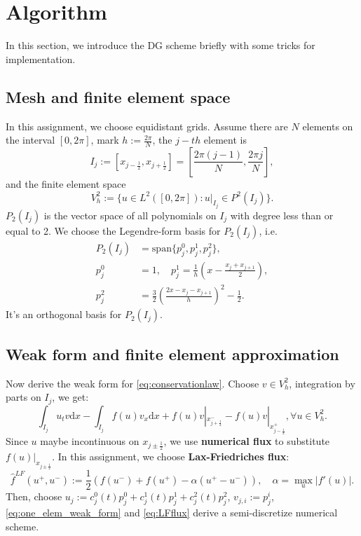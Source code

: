 \documentclass[a4paper]{article}
\newcommand{\dif}{\mathrm{d}}
\begin{document}
\section{Algorithm}
In this section, we introduce the DG scheme briefly with some tricks for implementation.

\subsection{Mesh and finite element space}
In this assignment, we choose equidistant grids. Assume there are $N$ elements on the 
interval $[0,2\pi]$, mark $h:=\frac{2\pi}{N}$, the $j-th$ element is 
\begin{displaymath}
    I_{j}:=[x_{j-\frac{1}{2}},x_{j+\frac{1}{2}}]
    =\left[\frac{2\pi(j-1)}{N},\frac{2\pi j}{N}\right],
\end{displaymath}
and the finite element space 
\begin{displaymath}
    V_{h}^{2}:=\{u\in L^{2}([0,2\pi]):u|_{I_j}\in P^{2}(I_j)\}.
\end{displaymath}
$P_{2}(I_{j})$ is the vector space of all polynomials on 
$I_{j}$ with degree less than or equal to 2. 
We choose the Legendre-form basis for $P_{2}(I_{j})$, i.e. 
\begin{equation}
    \label{eq:basis}
    \begin{aligned}
        P_{2}(I_j)&=\text{span}\{p_{j}^{0},p_{j}^{1},p_{j}^2\},\\
        p_{j}^{0}&=1,\quad p_{j}^{1}=\frac{1}{h}\left(x-\frac{x_{j}+x_{j+1}}{2}\right),\\
        p_{j}^{2}&=\frac{3}{2}\left(\frac{2x-x_{j}-x_{j+1}}{h}\right)^2-\frac{1}{2}.
    \end{aligned}
\end{equation}
It's an orthogonal basis for $P_{2}(I_j)$.
\subsection{Weak form and finite element approximation}
Now derive the weak form for \eqref{eq:conservationlaw}. Choose $v\in V_{h}^{2}$, 
integration by parts on $I_{j}$, we get:
\begin{equation}
    \label{eq:one_elem_weak_form}
    \int_{I_j}u_t v\dif x-\int_{I_j}f(u)v_x\dif x+f(u)v|_{x_{j+\frac{1}{2}}^{-}}
    -f(u)v|_{x_{j-\frac{1}{2}}^{+}}, \forall u\in V_{h}^{2}.
\end{equation}
Since $u$ maybe incontinuous on $x_{j\pm\frac{1}{2}}$, we use 
\textbf{numerical flux} to substitute $f(u)|_{x_{j\pm\frac{1}{2}}}$. 
In this assignment, we choose \textbf{Lax-Friedriches flux}:
\begin{equation}
    \label{eq:LFflux}
    \hat{f}^{LF}(u^{+},u^{-}):=\frac{1}{2}
    \left(f(u^-)+f(u^+)-\alpha(u^{+}-u^{-})\right),
    \quad \alpha=\max_{u}|f'(u)|.
\end{equation}
Then, choose $u_{j}:=c_{j}^{0}(t)p_{j}^{0}+c_{j}^{1}(t)p_{j}^{1}+c_{j}^{2}(t)p_{j}^{2}$, 
$v_{j,i}:=p_{j}^{i}$, \eqref{eq:one_elem_weak_form} and \eqref{eq:LFflux} 
derive a semi-discretize numerical scheme.
\end{document}
